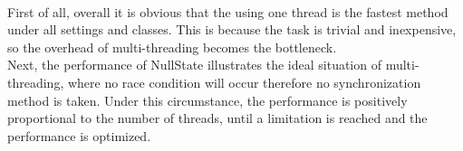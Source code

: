 \documentclass[letterpaper,twocolumn,10pt]{article}
\begin{document}
\begin{table}[h!]
\caption {500 entries on server 10}
\end{table}\\


First of all, overall it is obvious that the using one thread is the fastest method under all settings and classes. This is because the task is trivial and inexpensive, so the overhead of multi-threading becomes the bottleneck. \\

Next, the performance of NullState illustrates the ideal situation of multi-threading, where no race condition will occur therefore no synchronization method is taken. Under this circumstance, the performance is positively proportional to the number of threads, until a limitation is reached and the performance is optimized.\\
\end{document}
